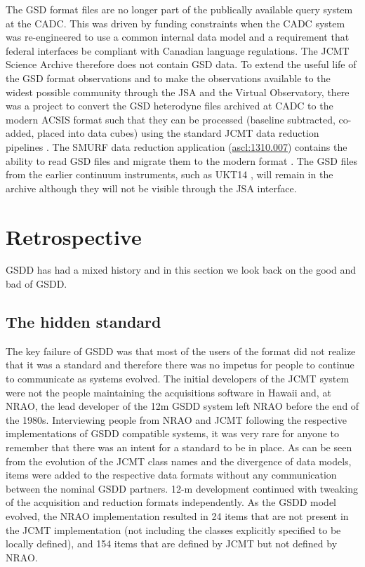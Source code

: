 \documentclass[final,authoryear,5p,times,twocolumn]{elsarticle}
\newcommand{\ascl}[1]{\href{http://www.ascl.net/#1}{ascl:#1}}
\begin{document}
The GSD format files are no longer part of the publically available
query system at the CADC. This was driven by funding constraints when
the CADC system was re-engineered to use a common internal data model
\citep{2013ASPC..475..159R} and a requirement that federal interfaces
be compliant with Canadian language regulations. The JCMT Science
Archive \citep[JSA;][]{2015Economou} therefore does not contain GSD
data.  To extend the useful life of the GSD format observations and to
make the observations available to the widest possible community
through the JSA and the Virtual Observatory, there was a project to
convert the GSD heterodyne files archived at CADC to the modern ACSIS
format \citep{OCS_ICD_022} such that they can be processed (baseline
subtracted, co-added, placed into data cubes) using the
standard JCMT data reduction pipelines
\citep{2015ACSISDR,2008ASPC..394..565J}. The SMURF data reduction
application (\ascl{1310.007}\nocite{2013ascl.soft10007J}) contains the
ability to read GSD files and migrate them to the modern format
\citep{SUN259}.  The GSD files from the earlier continuum instruments,
such as UKT14 \citep{1990MNRAS.243..126D}, will remain in the archive
although they will not be visible through the JSA interface.

\section{Retrospective}

GSDD has had a mixed history and in this section we look back on the
good and bad of GSDD.

\subsection{The hidden standard}
\label{sec:hidden}

The key failure of GSDD was that most of the users of the format did
not realize that it was a standard and therefore there was no
impetus for people to continue to communicate as systems
evolved. The initial developers of the JCMT system were not the people
maintaining the acquisitions software in Hawaii and, at NRAO, the lead developer of
the 12m GSDD system left NRAO before the end of the 1980s.
Interviewing people from NRAO and JCMT following the
respective implementations of GSDD compatible systems, it was very rare
for anyone to remember that there was an intent for a standard to be
in place. As can be seen from the evolution of the JCMT class names
and the divergence of data models, items were added to the respective
data formats without any communication between the nominal GSDD
partners. 12-m development continued with tweaking of the acquisition
and reduction formats independently.  As the GSDD model evolved, the
NRAO implementation resulted in 24 items that are not present in the
JCMT implementation (not including the classes explicitly specified to
be locally defined), and 154 items that are defined by JCMT but not
defined by NRAO.
\end{document}
